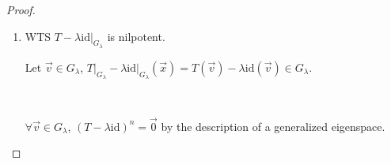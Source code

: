 \documentclass[11pt,fleqn]{book} %
\begin{document}
\begin{proof}
\begin{enumerate}[label=\alph*)]
\begin{itemize}
\begin{exercise}
                \begin{proof}
                    Let $\vec{w} \in \mathrm{Im}~S$. $S(\vec{w}) \in \mathrm{Im}~S$. 
                \end{proof}
            \end{exercise}
            
            $T\big|_U: U \to U$, $\dim U < n$. 
                
            By induction hypothesis, $U = G_{\lambda_2} \oplus \cdots \oplus G_{\lambda_k}$
            
            {~~~}
            
            Note that $G_{\lambda_1} = G(\lambda_1, T)$, but $G_{\lambda_2} = G(\lambda_2, T\big|_U)$. 
            
            WTS $G(\lambda_i, T\big|_U) = G(\lambda_i, T)$. 
            \begin{itemize}
                \item $G(\lambda_i, T\big|_U) \underset{S.S.}{\subseteq} G(\lambda_i, T)$
                
                Let $\vec{v} \in G(\lambda_i, T\big|_U)$. 
                
                $(T\big|_U - \lambda_i\mathrm{id})^n \vec{v} = \vec{0}$. 
                
                $\underbrace{(T - \lambda_i\mathrm{id})^n}_{p(T)} \vec{v} = (T\big|_U - \lambda_i\mathrm{id})^n \vec{v} = \vec{0}$. 
                
                \item $G(\lambda_i, T) \underset{S.S.}{\subseteq} G(\lambda_i, T\big|_U)$
                
                Let $\vec{v} \in G(\lambda_i, T)$. 
                
                Show that $\vec{v} \in U$. 
                
                $\vec{v} = \vec{v}_1 + \vec{u}_2 + \cdots + \vec{u}_k$ = a component in $G_{\lambda_1}$ + a component in $U$. 
            \end{itemize}
        \end{itemize}
        
        {~~~}
        
        \item WTS $T - \lambda\mathrm{id}\big|_{G_\lambda}$ is nilpotent. 
        
        Let $\vec{v} \in G_\lambda$, $T\big|_{G_\lambda} - \lambda\mathrm{id}\big|_{G_\lambda}(\vec{x}) = T(\vec{v}) - \lambda\mathrm{id}(\vec{v}) \in G_\lambda$.
        
        {~~~}
        
        $\forall \vec{v} \in G_\lambda$, $(T - \lambda\mathrm{id})^n = \vec{0}$ by the description of a generalized eigenspace. 
    \end{enumerate}
\end{proof}
\end{document}
